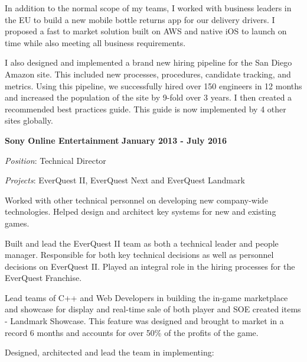 \documentclass{article}
\begin{document}
\vspace{\baselineskip}
In addition to the normal scope of my teams, I worked with business leaders in the EU to build a new mobile bottle returns app for our delivery drivers. I proposed a fast to market solution built on AWS and native iOS to launch on time while also meeting all business requirements.
\par
\vspace{\baselineskip}
I also designed and implemented a brand new hiring pipeline for the San Diego Amazon site. This included new processes, procedures, candidate tracking, and metrics.  Using this pipeline, we successfully hired over 150 engineers in 12 months and increased the population of the site by 9-fold over 3 years. I then created a recommended best practices guide. This guide is now implemented by 4 other sites globally. 
\par
\vspace{\baselineskip}
{\bf Sony Online Entertainment}
\hfill {\bf January 2013 - July 2016}
\vspace{.03in}
\par
{\it Position}: Technical Director
\par
{\it Projects}: EverQuest II, EverQuest Next and EverQuest Landmark
\vspace{\baselineskip}
\par
Worked with other technical personnel on developing new company-wide
technologies.  Helped design and architect key systems for new and existing
games.
\par
\vspace{\baselineskip}
Built and lead the EverQuest II team as both a technical leader and people manager.  Responsible for both key technical decisions as well as personnel decisions on EverQuest II.  Played an integral role in the hiring processes for the EverQuest Franchise.
\par
\vspace{\baselineskip}
Lead teams of C++ and Web Developers in building the
in-game marketplace and showcase for display and real-time sale of both player and SOE created items - 
Landmark Showcase.  This feature was designed and brought to market in a record 6 months and accounts
for over 50\% of the profits of the game.
\par
\vspace{\baselineskip}
Designed, architected and lead the team in implementing: 
\end{document}
